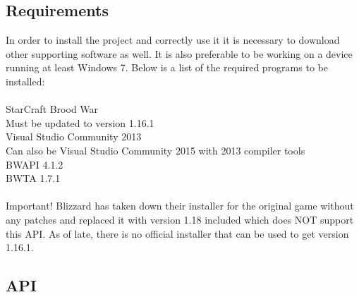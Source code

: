 \documentclass[10pt,letterpaper,onecolumn,draftclsnofoot]{IEEEtran}
\begin{document}
\subsection{Requirements}
In order to install the project and correctly use it it is necessary to download other supporting software as well. It is also preferable to be working on a device running at least Windows 7. Below is a list of the required programs to be installed:\\
\\
StarCraft Brood War\\
Must be updated to version 1.16.1\\
Visual Studio Community 2013\\
Can also be Visual Studio Community 2015 with 2013 compiler tools\\
BWAPI 4.1.2\\
BWTA 1.7.1\\
\\
Important! Blizzard has taken down their installer for the original game without any patches and replaced it with version 1.18 included which does NOT support this API. As of late, there is no official installer that can be used to get version 1.16.1.
\subsection{API}
\end{document}
